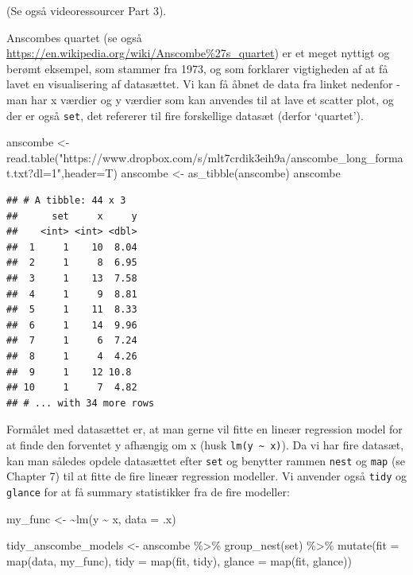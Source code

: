\documentclass[
]{book}
\newenvironment{Shaded}{\begin{snugshade}}{\end{snugshade}}
\newcommand{\AttributeTok}[1]{\textcolor[rgb]{0.77,0.63,0.00}{#1}}
\newcommand{\ErrorTok}[1]{\textcolor[rgb]{0.64,0.00,0.00}{\textbf{#1}}}
\newcommand{\FunctionTok}[1]{\textcolor[rgb]{0.00,0.00,0.00}{#1}}
\newcommand{\NormalTok}[1]{#1}
\newcommand{\OtherTok}[1]{\textcolor[rgb]{0.56,0.35,0.01}{#1}}
\newcommand{\SpecialCharTok}[1]{\textcolor[rgb]{0.00,0.00,0.00}{#1}}
\newcommand{\StringTok}[1]{\textcolor[rgb]{0.31,0.60,0.02}{#1}}
\begin{document}
(Se også videoressourcer Part 3).

Anscombes quartet (se også \url{https://en.wikipedia.org/wiki/Anscombe\%27s_quartet}) er et meget nyttigt og berømt eksempel, som stammer fra 1973, og som forklarer vigtigheden af at få lavet en visualisering af datasættet. Vi kan få åbnet de data fra linket nedenfor - man har x værdier og y værdier som kan anvendes til at lave et scatter plot, og der er også \texttt{set}, det refererer til fire forskellige datasæt (derfor `quartet').

\begin{Shaded}
\begin{Highlighting}[]
\NormalTok{anscombe }\OtherTok{\textless{}{-}} \FunctionTok{read.table}\NormalTok{(}\StringTok{"https://www.dropbox.com/s/mlt7crdik3eih9a/anscombe\_long\_format.txt?dl=1"}\NormalTok{,}\AttributeTok{header=}\NormalTok{T)}
\NormalTok{anscombe }\OtherTok{\textless{}{-}} \FunctionTok{as\_tibble}\NormalTok{(anscombe)}
\NormalTok{anscombe}
\end{Highlighting}
\end{Shaded}

\begin{verbatim}
## # A tibble: 44 x 3
##      set     x     y
##    <int> <int> <dbl>
##  1     1    10  8.04
##  2     1     8  6.95
##  3     1    13  7.58
##  4     1     9  8.81
##  5     1    11  8.33
##  6     1    14  9.96
##  7     1     6  7.24
##  8     1     4  4.26
##  9     1    12 10.8 
## 10     1     7  4.82
## # ... with 34 more rows
\end{verbatim}

Formålet med datasættet er, at man gerne vil fitte en lineær regression model for at finde den forventet y afhængig om x (husk \texttt{lm(y\ \textasciitilde{}\ x)}). Da vi har fire datasæt, kan man således opdele datasættet efter \texttt{set} og benytter rammen \texttt{nest} og \texttt{map} (se Chapter 7) til at fitte de fire lineær regression modeller. Vi anvender også \texttt{tidy} og \texttt{glance} for at få summary statistikker fra de fire modeller:

\begin{Shaded}
\begin{Highlighting}[]
\NormalTok{my\_func }\OtherTok{\textless{}{-}} \ErrorTok{\textasciitilde{}}\FunctionTok{lm}\NormalTok{(y }\SpecialCharTok{\textasciitilde{}}\NormalTok{ x, }\AttributeTok{data =}\NormalTok{ .x)}

\NormalTok{tidy\_anscombe\_models }\OtherTok{\textless{}{-}}\NormalTok{ anscombe }\SpecialCharTok{\%\textgreater{}\%} 
  \FunctionTok{group\_nest}\NormalTok{(set) }\SpecialCharTok{\%\textgreater{}\%} 
  \FunctionTok{mutate}\NormalTok{(}\AttributeTok{fit =} \FunctionTok{map}\NormalTok{(data, my\_func),}
         \AttributeTok{tidy =} \FunctionTok{map}\NormalTok{(fit, tidy),}
         \AttributeTok{glance =} \FunctionTok{map}\NormalTok{(fit, glance))}
\end{Highlighting}
\end{Shaded}
\end{document}
